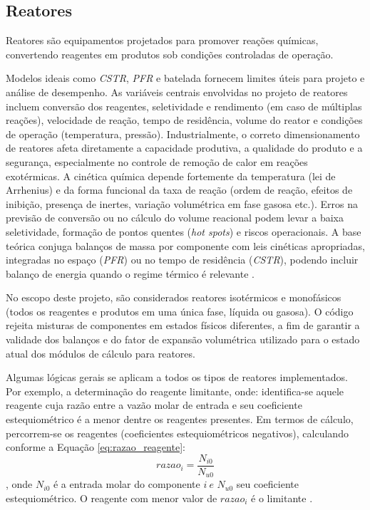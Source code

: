 \subsection{Reatores}

Reatores são equipamentos projetados para promover reações químicas, convertendo reagentes em produtos sob condições controladas de operação.

Modelos ideais como \textit{CSTR}, \textit{PFR} e batelada fornecem limites úteis para projeto e análise de desempenho. As variáveis centrais envolvidas no projeto de reatores incluem conversão dos reagentes, seletividade e rendimento (em caso de múltiplas reações), velocidade de reação, tempo de residência, volume do reator e condições de operação (temperatura, pressão). Industrialmente, o correto dimensionamento de reatores afeta diretamente a capacidade produtiva, a qualidade do produto e a segurança, especialmente no controle de remoção de calor em reações exotérmicas. A cinética química depende fortemente da temperatura (lei de Arrhenius) e da forma funcional da taxa de reação (ordem de reação, efeitos de inibição, presença de inertes, variação volumétrica em fase gasosa etc.). Erros na previsão de conversão ou no cálculo do volume reacional podem levar a baixa seletividade, formação de pontos quentes (\textit{hot spots}) e riscos operacionais. A base teórica conjuga balanços de massa por componente com leis cinéticas apropriadas, integradas no espaço (\textit{PFR}) ou no tempo de residência (\textit{CSTR}), podendo incluir balanço de energia quando o regime térmico é relevante \cite{fogler2009,levenspiel2000}.

No escopo deste projeto, são considerados reatores isotérmicos e monofásicos (todos os reagentes e produtos em uma única fase, líquida ou gasosa). O código rejeita misturas de componentes em estados físicos diferentes, a fim de garantir a validade dos balanços e do fator de expansão volumétrica utilizado para o estado atual dos módulos de cálculo para reatores.

Algumas lógicas gerais se aplicam a todos os tipos de reatores implementados. Por exemplo, a determinação do reagente limitante, onde: identifica-se aquele reagente cuja razão entre a vazão molar de entrada e seu coeficiente estequiométrico é a menor dentre os reagentes presentes. Em termos de cálculo, percorrem-se os reagentes (coeficientes estequiométricos negativos), calculando conforme a Equação \ref{eq:razao_reagente}:
\begin{equation}
{razao}_{i} = \frac{N_{i 0}}{N_{u 0}}
\label{eq:razao_reagente}
\end{equation}, onde $N_{i 0}$ é a entrada molar do componente $i \  e$ $N_{u 0}$ seu coeficiente estequiométrico. O reagente com menor valor de ${razao}_{i}$ é o limitante \cite{felder2005}.

